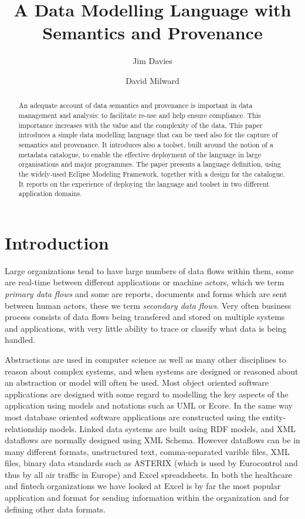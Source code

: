 \documentclass{llncs}
\begin{document}
	\frontmatter          %
	\pagestyle{headings}  %
	\title{A Data Modelling Language with Semantics and Provenance}
	
	\author{Jim Davies \and
		David Milward}
	
	
	
	\maketitle
	
	\begin{abstract}
		An adequate account of data semantics and provenance is important in data management and analysis: to facilitate re-use and help ensure compliance.  This importance increases with the value and the complexity of the data.  This paper introduces a simple data modelling language that can be used also for the capture of semantics and provenance.  It introduces also a toolset, built around the notion of a metadata catalogue, to enable the effective deployment of the language in large organisations and major programmes.  The paper presents a language definition, using the widely-used Eclipse Modeling Framework, together with a design for the catalogue.  It reports on the experience of deploying the language and toolset in two different application domains.
	\end{abstract}
	
	\section{Introduction}
	
	Large organizations tend to have large numbers of data flows within them, some are real-time between different applications or machine actors, which we term \emph{primary data flows} and some are reports, documents and forms which are sent between human actors, these we term \emph{secondary data flows}. Very often business process consists of data flows being transfered and stored on multiple systems and applications, with very little ability to trace or classify what data is being handled.
	
	Abstractions are used in computer science as well as many other disciplines to reason about complex systems, and when systems are designed or reasoned about an abstraction or model will often be used.  Most object oriented software applications are designed with some regard to modelling the key aspects of the application using models and notations such as UML or Ecore.  In the same way most database oriented software applications are constructed using the entity-relationship models. Linked data systems are built using RDF models, and XML dataflows are normally designed using XML Schema. However dataflows can be in many different formats, unstructured text, comma-separated varible files, XML files, binary data standards such as ASTERIX (which is used by Eurocontrol and thus by all air traffic in Europe) and Excel spreadsheets. In both the healthcare and fintech organizations we have looked at Excel is by far the most popular application and format for sending information within the organization and for defining other data formats.
	
\end{document}
